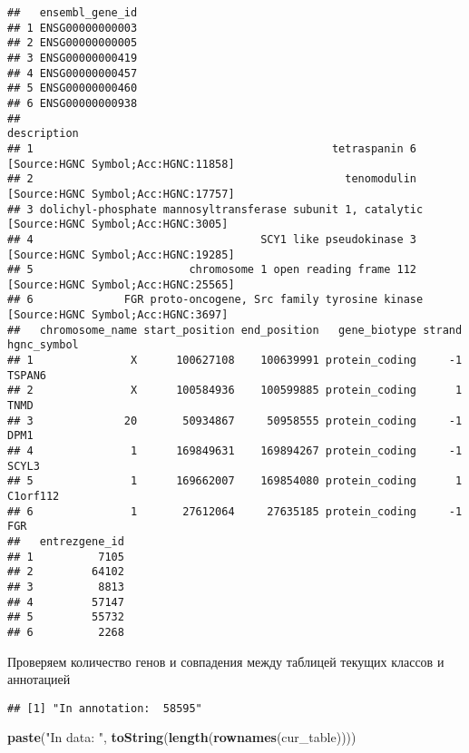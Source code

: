 \documentclass[
]{article}
\newenvironment{Shaded}{\begin{snugshade}}{\end{snugshade}}
\newcommand{\KeywordTok}[1]{\textcolor[rgb]{0.13,0.29,0.53}{\textbf{#1}}}
\newcommand{\NormalTok}[1]{#1}
\newcommand{\OperatorTok}[1]{\textcolor[rgb]{0.81,0.36,0.00}{\textbf{#1}}}
\newcommand{\StringTok}[1]{\textcolor[rgb]{0.31,0.60,0.02}{#1}}
\begin{document}
\begin{verbatim}
##   ensembl_gene_id
## 1 ENSG00000000003
## 2 ENSG00000000005
## 3 ENSG00000000419
## 4 ENSG00000000457
## 5 ENSG00000000460
## 6 ENSG00000000938
##                                                                                      description
## 1                                              tetraspanin 6 [Source:HGNC Symbol;Acc:HGNC:11858]
## 2                                                tenomodulin [Source:HGNC Symbol;Acc:HGNC:17757]
## 3 dolichyl-phosphate mannosyltransferase subunit 1, catalytic [Source:HGNC Symbol;Acc:HGNC:3005]
## 4                                   SCY1 like pseudokinase 3 [Source:HGNC Symbol;Acc:HGNC:19285]
## 5                        chromosome 1 open reading frame 112 [Source:HGNC Symbol;Acc:HGNC:25565]
## 6              FGR proto-oncogene, Src family tyrosine kinase [Source:HGNC Symbol;Acc:HGNC:3697]
##   chromosome_name start_position end_position   gene_biotype strand hgnc_symbol
## 1               X      100627108    100639991 protein_coding     -1      TSPAN6
## 2               X      100584936    100599885 protein_coding      1        TNMD
## 3              20       50934867     50958555 protein_coding     -1        DPM1
## 4               1      169849631    169894267 protein_coding     -1       SCYL3
## 5               1      169662007    169854080 protein_coding      1    C1orf112
## 6               1       27612064     27635185 protein_coding     -1         FGR
##   entrezgene_id
## 1          7105
## 2         64102
## 3          8813
## 4         57147
## 5         55732
## 6          2268
\end{verbatim}

Проверяем количество генов и совпадения между таблицей текущих классов и
аннотацией

\begin{Shaded}
\end{Shaded}

\begin{verbatim}
## [1] "In annotation:  58595"
\end{verbatim}

\begin{Shaded}
\begin{Highlighting}[]
\KeywordTok{paste}\NormalTok{(}\StringTok{"In data: "}\NormalTok{, }\KeywordTok{toString}\NormalTok{(}\KeywordTok{length}\NormalTok{(}\KeywordTok{rownames}\NormalTok{(cur_table))))}
\end{Highlighting}
\end{Shaded}
\end{document}
